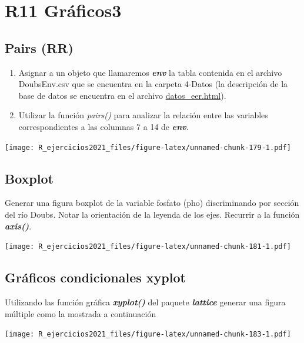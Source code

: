 \documentclass[]{book}
\begin{document}
\hypertarget{r11-gruxe1ficos3}{%
\chapter*{R11 Gráficos3}\label{r11-gruxe1ficos3}}

\hypertarget{pairs-rr}{%
\section{Pairs (RR)}\label{pairs-rr}}

\begin{enumerate}
\def\labelenumi{\arabic{enumi}.}
\item
  Asignar a un objeto que llamaremos \textbf{\emph{env}} la tabla contenida en el archivo DoubsEnv.csv que se encuentra en la carpeta 4-Datos (la descripción de la base de datos se encuentra en el archivo \url{datos_eer.html}).
\item
  Utilizar la función \emph{pairs()} para analizar la relación entre las variables correspondientes a las columnas 7 a 14 de \textbf{\emph{env}}.
\end{enumerate}

\texttt{[image: R\_ejercicios2021\_files/figure-latex/unnamed-chunk-179-1.pdf]}

\hypertarget{boxplot}{%
\section{Boxplot}\label{boxplot}}

Generar una figura boxplot de la variable fosfato (pho) discriminando por sección del río Doubs. Notar la orientación de la leyenda de los ejes. Recurrir a la función \emph{\textbf{axis()}}.

\texttt{[image: R\_ejercicios2021\_files/figure-latex/unnamed-chunk-181-1.pdf]}

\hypertarget{gruxe1ficos-condicionales-xyplot}{%
\section{Gráficos condicionales xyplot}\label{gruxe1ficos-condicionales-xyplot}}

Utilizando las función gráfica \emph{\textbf{xyplot()}} del paquete \emph{\textbf{lattice}} generar una figura múltiple como la mostrada a continuación

\texttt{[image: R\_ejercicios2021\_files/figure-latex/unnamed-chunk-183-1.pdf]}
\end{document}
